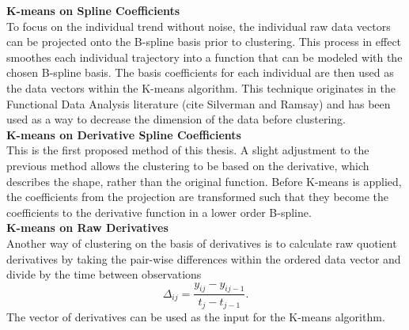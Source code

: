 \documentclass[12pt]{article}
\begin{document}
\textbf{K-means on Spline Coefficients}\\
To focus on the individual trend without noise, the individual raw data vectors can be projected onto the B-spline basis prior to clustering. This process in effect smoothes each individual trajectory into a function that can be modeled with the chosen B-spline basis. The basis coefficients for each individual are then used as the data vectors within the K-means algorithm. This technique originates in the Functional Data Analysis literature (cite Silverman and Ramsay) and has been used as a way to decrease the dimension of the data before clustering. \\

\textbf{K-means on Derivative Spline Coefficients}\\
This is the first proposed method of this thesis. A slight adjustment to the previous method allows the clustering to be based on the derivative, which describes the shape, rather than the original function. Before K-means is applied, the coefficients from the projection are transformed such that they become the coefficients to the derivative function in a lower order B-spline. \\

\textbf{K-means on Raw Derivatives}\\
Another way of clustering on the basis of derivatives is to calculate raw quotient derivatives by taking the pair-wise differences within the ordered data vector and divide by the time between observations
$$\Delta_{ij} = \frac{y_{ij}-y_{ij-1}}{t_{j}-t_{j-1}}.$$
The vector of derivatives can be used as the input for the K-means algorithm.\\
\end{document}
